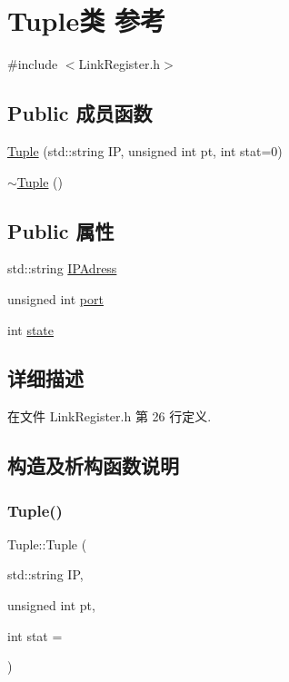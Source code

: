 \hypertarget{class_tuple}{}\section{Tuple类 参考}
\label{class_tuple}


{\ttfamily \#include $<$Link\+Register.\+h$>$}

\subsection*{Public 成员函数}
\begin{DoxyCompactItemize}
\item 
\hyperlink{class_tuple_a982d5686d92651ec8364c1fd62d834aa}{Tuple} (std\+::string IP, unsigned int pt, int stat=0)
\item 
\hyperlink{class_tuple_ac25be2d63d4ca6755bcf8e699c413f27}{$\sim$\+Tuple} ()
\end{DoxyCompactItemize}
\subsection*{Public 属性}
\begin{DoxyCompactItemize}
\item 
std\+::string \hyperlink{class_tuple_ab337a99a4e1461e69583204f91411236}{I\+P\+Adress}
\item 
unsigned int \hyperlink{class_tuple_aaf88caeb0b83349dcdb398babe704999}{port}
\item 
int \hyperlink{class_tuple_a600cae002bc27e9345905a600f0736ae}{state}
\end{DoxyCompactItemize}


\subsection{详细描述}


在文件 Link\+Register.\+h 第 26 行定义.



\subsection{构造及析构函数说明}
\mbox{\label{class_tuple_a982d5686d92651ec8364c1fd62d834aa}} 
\subsubsection{\texorpdfstring{Tuple()}{Tuple()}}
{\footnotesize\ttfamily Tuple\+::\+Tuple (\begin{DoxyParamCaption}\item[{std\+::string}]{IP,  }\item[{unsigned int}]{pt,  }\item[{int}]{stat = {} }\end{DoxyParamCaption})\hspace{0.3cm}{\ttfamily [inline]}}




